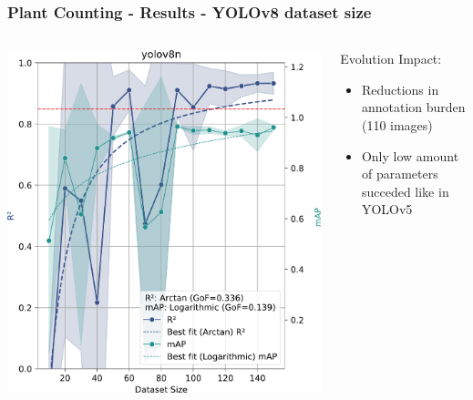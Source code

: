 \documentclass[aspectratio=43]{beamer}
\begin{document}
\begin{frame}
    \frametitle{Plant Counting - Results - YOLOv8 dataset size}
    \begin{columns}
        \begin{column}{0.5\textwidth}
            \begin{center}
                \includegraphics[width=1\textwidth]{Imgs/r2_ap_vs_dataset_size_yolov8_2.pdf}
            \end{center}
        \end{column}
        
        \begin{column}{0.5\textwidth}
            \begin{block}{Evolution Impact:}
                \scriptsize
                \begin{itemize}
                \item Reductions in annotation burden (110 images)
                \item Only low amount of parameters succeded like in YOLOv5
                \end{itemize}
            \end{block}
        \end{column}
    \end{columns}
\end{frame}
\end{document}
